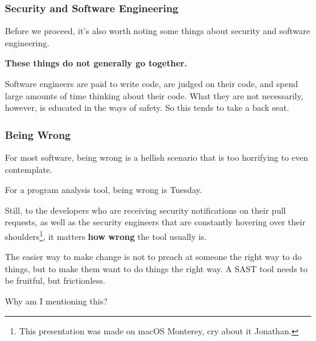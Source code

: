\documentclass[aspectratio=169, handout]{beamer}
\begin{document}
 \begin{frame}[fragile]
   \frametitle{Security and Software Engineering}

  Before we proceed, it's also worth noting some things about security and software engineering.

  \pause
  \vspace{\fill}

  \textbf{These things do not generally go together.}

  \pause
  \vspace{\fill}

  Software engineers are paid to write code, are judged on their code, and spend
  large amounts of time thinking about their code. What they are not necessarily,
  however, is educated in the ways of safety. So this tends to take a back seat.
 \end{frame}

 \begin{frame}[fragile]
   \frametitle{Being Wrong}

   For most software, being wrong is a hellish scenario that is too horrifying
   to even contemplate.

   \pause
   \vspace{\fill}

   For a program analysis tool, being wrong is Tuesday.

   \pause
   \vspace{\fill}

   Still, to the developers who are receiving security notifications on their
   pull requests, as well as the security engineers that are constantly hovering
   over their shoulders\footnote{This presentation was made on macOS Monterey, cry about it Jonathan.\footnotemark[16]}, it matters \textbf{how wrong} the tool
   usually is.

   \pause
   \vspace{\fill}

   The easier way to make change is not to preach at someone the right
   way to do things, but to make them want to do things the right way. A
   SAST tool needs to be fruitful, but frictionless.

   \pause
   \vspace{\fill}

   Why am I mentioning this?

 \end{frame}
\end{document}
